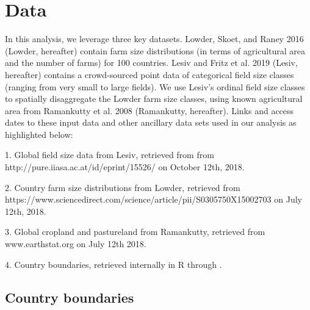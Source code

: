 \documentclass{article}\usepackage[]{graphicx}\usepackage[]{xcolor}
\begin{document}
\section{Data}

In this analysis, we leverage three key datasets. Lowder, Skoet, and Raney 2016 \cite{Lowder} (Lowder, hereafter) contain farm size distributions (in terms of agricultural area and the number of farms) for 100 countries. Lesiv and Fritz et al. 2019 \cite{Lesiv} (Lesiv, hereafter) contains a crowd-sourced point data of categorical field size classes (ranging from very small to large fields). We use Lesiv’s ordinal field size classes to spatially disaggregate the Lowder farm size classes, using known agricultural area from Ramankutty et al. 2008 \cite{Ramankutty} (Ramankutty, hereafter). Links and access dates to these input data and other ancillary data sets used in our analysis as highlighted below:

1. Global field size data from Lesiv, retrieved from from http://pure.iiasa.ac.at/id/eprint/15526/ on October 12th, 2018.

2. Country farm size distributions from Lowder, retrieved from \newline 
https://www.sciencedirect.com/science/article/pii/S0305750X15002703 on July 12th, 2018.

3. Global cropland and pastureland from Ramankutty, retrieved from www.earthstat.org on July 12th 2018.

4. Country boundaries, retrieved internally in R through \cite{R-rworldmap}.


\subsection{Country boundaries}
\end{document}
